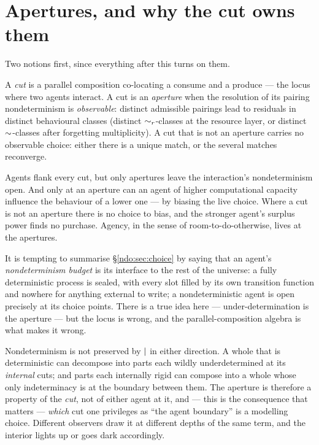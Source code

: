 \section{Apertures, and why the cut owns them}\label{ndo:sec:aperture}

Two notions first, since everything after this turns on them.

\begin{definition}\label{ndo:def:aperture}
A \emph{cut} is a parallel composition co-locating a consume and a produce --- the
locus where two agents interact. A cut is an \emph{aperture} when the resolution of
its pairing nondeterminism is \emph{observable}: distinct admissible pairings lead to
residuals in distinct behavioural classes (distinct $\sim_{r}$-classes at the resource
layer, or distinct $\sim$-classes after forgetting multiplicity). A cut that is not
an aperture carries no observable choice: either there is a unique match, or the
several matches reconverge.
\end{definition}

\begin{principle}\label{ndo:prin:main}
Agents flank every cut, but only apertures leave the interaction's nondeterminism
open. And only at an aperture can an agent of higher computational capacity influence
the behaviour of a lower one --- by biasing the live choice. Where a cut is not an
aperture there is no choice to bias, and the stronger agent's surplus power finds no
purchase. Agency, in the sense of room-to-do-otherwise, lives at the apertures.
\end{principle}


It is tempting to summarise \S\ref{ndo:sec:choice} by saying that an agent's
\emph{nondeterminism budget} is its interface to the rest of the universe: a
fully deterministic process is sealed, with every slot filled by its own
transition function and nowhere for anything external to write; a
nondeterministic agent is open precisely at its choice points. There is a true
idea here --- under-determination is the aperture --- but the locus is wrong, and
the parallel-composition algebra is what makes it wrong.

Nondeterminism is not preserved by $\mid$ in either direction. A whole that is
deterministic can decompose into parts each wildly underdetermined at its
\emph{internal} cuts; and parts each internally rigid can compose into a whole
whose only indeterminacy is at the boundary between them. The aperture is
therefore a property of the \emph{cut}, not of either agent at it, and --- this is
the consequence that matters --- \emph{which} cut one privileges as ``the agent
boundary'' is a modelling choice. Different observers draw it at different depths
of the same term, and the interior lights up or goes dark accordingly.

